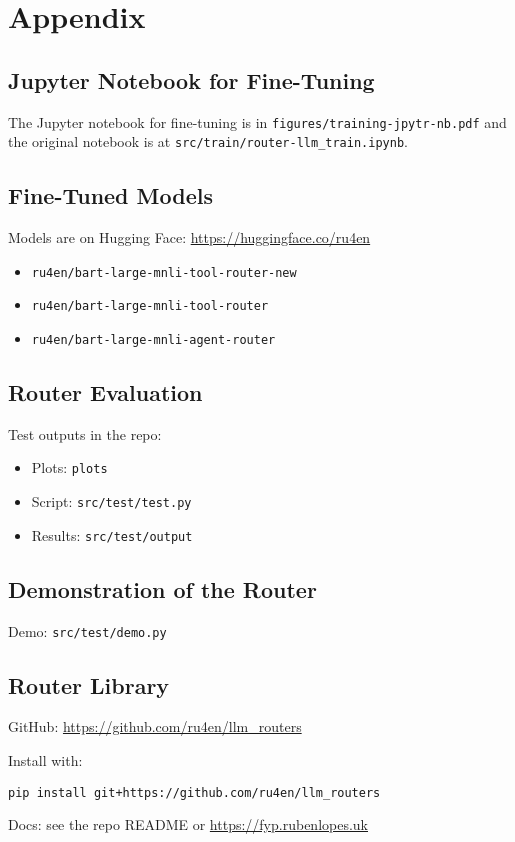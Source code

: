 \chapter{Appendix}
\label{appn:A}

\section{Jupyter Notebook for Fine-Tuning}
\label{sec:jupyter-notebook-for-fine-tuning}
\vspace{-0.5em}
{\small
The Jupyter notebook for fine-tuning is in \texttt{figures/training-jpytr-nb.pdf} and the original notebook is at \texttt{src/train/router-llm\_train.ipynb}.
}

\section{Fine-Tuned Models}
\label{sec:fine-tuning-models}
\vspace{-0.5em}
{\small
Models are on Hugging Face: \url{https://huggingface.co/ru4en}
\begin{itemize}[nosep]
    \item \texttt{ru4en/bart-large-mnli-tool-router-new}
    \item \texttt{ru4en/bart-large-mnli-tool-router}
    \item \texttt{ru4en/bart-large-mnli-agent-router}
\end{itemize}
}

\section{Router Evaluation}
\label{sec:router-evaluation}
\vspace{-0.5em}
{\small
Test outputs in the repo:
\begin{itemize}[nosep]
    \item Plots: \texttt{plots}
    \item Script: \texttt{src/test/test.py}
    \item Results: \texttt{src/test/output}
\end{itemize}
}

\section{Demonstration of the Router}
\label{sec:router-demonstration}
\vspace{-0.5em}
{\small
Demo: \texttt{src/test/demo.py}
}

\section{Router Library}
\label{sec:router-library}
\vspace{-0.5em}
{\small
GitHub: \url{https://github.com/ru4en/llm_routers}

Install with:
\begin{verbatim}
pip install git+https://github.com/ru4en/llm_routers
\end{verbatim}

Docs: see the repo README or \url{https://fyp.rubenlopes.uk}
}